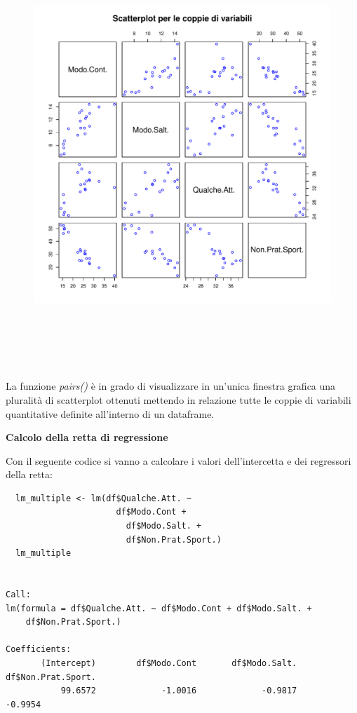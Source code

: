 \vspace{5mm}
\begin{figure}[!htbp]
    \centering
    \includegraphics[height=16cm]{ProgettoSAD/capitoli/images/s_desc_biv/scatterplot_coppievariabili.pdf}
\end{figure}
\vspace{5mm}

La funzione \textit{pairs()} è in grado di visualizzare in un'unica finestra grafica una pluralità di scatterplot ottenuti mettendo in relazione tutte le coppie di variabili quantitative definite all'interno di un dataframe.

\noindent \textbf{Calcolo della retta di regressione}

Con il seguente codice si vanno a calcolare i valori dell'intercetta e dei regressori della retta:

\vspace{5mm}
\begin{lstlisting}
  lm_multiple <- lm(df$Qualche.Att. ~
                      df$Modo.Cont +
                        df$Modo.Salt. +
                        df$Non.Prat.Sport.)
  lm_multiple


Call:
lm(formula = df$Qualche.Att. ~ df$Modo.Cont + df$Modo.Salt. + 
    df$Non.Prat.Sport.)

Coefficients:
       (Intercept)        df$Modo.Cont       df$Modo.Salt.  df$Non.Prat.Sport.  
           99.6572             -1.0016             -0.9817             -0.9954  
\end{lstlisting}
\vspace{5mm}

